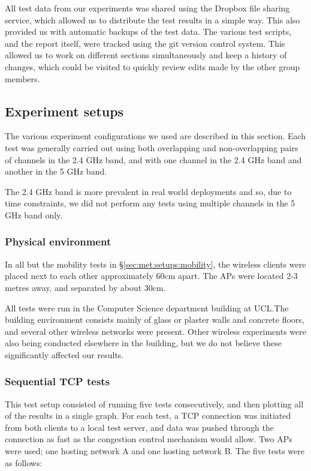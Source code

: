 All test data from our experiments was shared using the Dropbox file sharing
service, which allowed us to distribute the test results in a simple way. This
also provided us with automatic backups of the test data. The various test
scripts, and the report itself, were tracked using the git version control
system. This allowed us to work on different sections simultaneously and keep a
history of changes, which could be visited to quickly review edits made by the
other group members.

\subsection{Experiment setups}
\label{sec:met:setups}
The various experiment configurations we used are described in this section.
Each test was generally carried out using both overlapping and non-overlapping
pairs of channels in the 2.4 GHz band, and with one channel in the 2.4 GHz band
and another in the 5 GHz band.

The 2.4 GHz band is more prevalent in real world deployments and so, due to time
constraints, we did not perform any tests using multiple channels in the 5 GHz
band only.

\subsubsection{Physical environment}
In all but the mobility tests in \S\ref{sec:met:setups:mobility}, the wireless
clients were placed next to each other approximately 60cm apart. The APs were
located 2-3 metres away, and separated by about 30cm.

All tests were run in the Computer Science department building at UCL.\@ The
building environment consists mainly of glass or plaster walls and concrete
floors, and several other wireless networks were present. Other wireless
experiments were also being conducted elsewhere in the building, but we do not
believe these significantly affected our results.

\subsubsection{Sequential TCP tests}
\label{sec:met:setups:seqtcp}
This test setup consisted of running five tests consecutively, and then plotting
all of the results in a single graph. For each test, a TCP connection was
initiated from both clients to a local test server, and data was pushed through
the connection as fast as the congestion control mechanism would allow. Two APs
were used; one hosting network A and one hosting network B. The five tests were
as follows:

